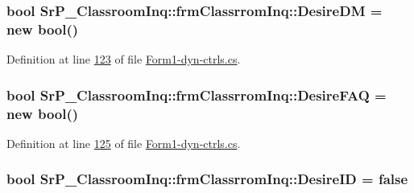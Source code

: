 \hypertarget{class_sr_p___classroom_inq_1_1frm_classrrom_inq_a8f8f9bb905b290fa448b445560458f89}{
\subsubsection[{\-Desire\-D\-M}]{\setlength{\rightskip}{0pt plus 5cm}bool {\bf \-Sr\-P\-\_\-\-Classroom\-Inq\-::frm\-Classrrom\-Inq\-::\-Desire\-D\-M} = new bool()}}
\label{class_sr_p___classroom_inq_1_1frm_classrrom_inq_a8f8f9bb905b290fa448b445560458f89}


\-Definition at line \hyperlink{_form1-dyn-ctrls_8cs_source_l00123}{123} of file \hyperlink{_form1-dyn-ctrls_8cs_source}{\-Form1-\/dyn-\/ctrls.\-cs}.

\hypertarget{class_sr_p___classroom_inq_1_1frm_classrrom_inq_ac893a3454dc239c417d6a1e67882d0cb}{
\subsubsection[{\-Desire\-F\-A\-Q}]{\setlength{\rightskip}{0pt plus 5cm}bool {\bf \-Sr\-P\-\_\-\-Classroom\-Inq\-::frm\-Classrrom\-Inq\-::\-Desire\-F\-A\-Q} = new bool()}}
\label{class_sr_p___classroom_inq_1_1frm_classrrom_inq_ac893a3454dc239c417d6a1e67882d0cb}


\-Definition at line \hyperlink{_form1-dyn-ctrls_8cs_source_l00125}{125} of file \hyperlink{_form1-dyn-ctrls_8cs_source}{\-Form1-\/dyn-\/ctrls.\-cs}.

\hypertarget{class_sr_p___classroom_inq_1_1frm_classrrom_inq_aad36cc9a93fb79969dd3b0d0fe52b793}{
\subsubsection[{\-Desire\-I\-D}]{\setlength{\rightskip}{0pt plus 5cm}bool {\bf \-Sr\-P\-\_\-\-Classroom\-Inq\-::frm\-Classrrom\-Inq\-::\-Desire\-I\-D} = false}}
\label{class_sr_p___classroom_inq_1_1frm_classrrom_inq_aad36cc9a93fb79969dd3b0d0fe52b793}


